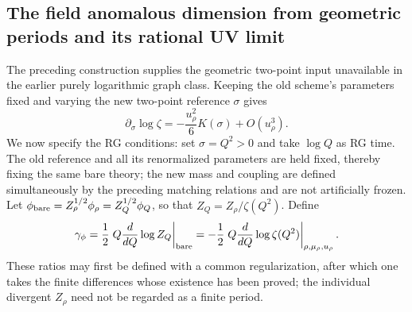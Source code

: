 \documentclass[11pt,a4paper,oneside]{article}
\theoremstyle{plain}
\theoremstyle{definition}
\theoremstyle{remark}
\numberwithin{equation}{section}
\begin{document}
\subsection{The field anomalous dimension from geometric periods and its rational UV limit}
The preceding construction supplies the geometric two-point input unavailable in the earlier purely logarithmic graph class.
Keeping the old scheme's parameters fixed and varying the new two-point reference $\sigma$ gives
\begin{equation}\label{sunsetjet:eq:scale-response}
 \partial_\sigma\log\zeta=-\frac{u_\rho^2}{6}K(\sigma)+O(u_\rho^3).
\end{equation}
We now specify the RG conditions: set $\sigma=Q^2>0$ and take $\log Q$ as RG time.
The old reference and all its renormalized parameters are held fixed, thereby fixing the same bare theory;
the new mass and coupling are defined simultaneously by the preceding matching relations and are not artificially frozen.
Let $\phi_{\rm bare}=Z_\rho^{1/2}\phi_\rho=Z_Q^{1/2}\phi_Q$,
so that $Z_Q=Z_\rho/\zeta(Q^2)$. Define
\begin{equation}\label{sunsetjet:eq:gamma-def}
 \gamma_\phi=\frac12\left.Q\frac{d}{dQ}\log Z_Q\right|_{\rm bare}
 =-\frac12\left.Q\frac{d}{dQ}\log\zeta(Q^2)\right|_{\rho,\mu_\rho,u_\rho}.
\end{equation}
These ratios may first be defined with a common regularization, after which one takes the finite differences whose existence has been proved;
the individual divergent $Z_\rho$ need not be regarded as a finite period.
\end{document}

